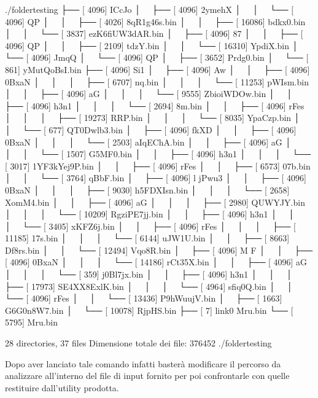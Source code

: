 \documentclass[letterpaper,10pt,italian,openany,oneside]{sphinxmanual}
\begin{document}
\begin{sphinxVerbatim}[commandchars=\\\{\}]
./folder\PYGZus{}testing
├── [       4096]  ICcJo
│   ├── [       4096]  2ymehX
│   │   └── [       4096]  QP
│   │       ├── [       4026]  8qR1g46s.bin
│   │       ├── [      16086]  bdkx0.bin
│   │       └── [       3837]  ezK6fiUW3dAR.bin
│   ├── [       4096]  87
│   │   ├── [       4096]  QP
│   │   ├── [       2109]  tdzY.bin
│   │   └── [      16310]  YpdiX.bin
│   └── [       4096]  JmqQ
│       └── [       4096]  QP
│           ├── [       3652]  Prdg0.bin
│           └── [        861]  yMutQoBsI.bin
├── [       4096]  Si1
│   ├── [       4096]  Aw
│   │   ├── [       4096]  0BxaN
│   │   │   ├── [       6707]  nq.bin
│   │   │   └── [      11253]  pWIsm.bin
│   │   ├── [       4096]  aG
│   │   │   └── [       9555]  ZbioiWDOw.bin
│   │   ├── [       4096]  h3n1
│   │   │   └── [       2694]  8m.bin
│   │   ├── [       4096]  rFes
│   │   │   ├── [      19273]  RRP.bin
│   │   │   └── [       8035]  YpaCzp.bin
│   │   └── [        677]  QT0Dwlb3.bin
│   ├── [       4096]  fkXD
│   │   ├── [       4096]  0BxaN
│   │   │   └── [       2503]  aIqEChA.bin
│   │   ├── [       4096]  aG
│   │   │   └── [       1507]  G5MF0.bin
│   │   ├── [       4096]  h3n1
│   │   │   └── [       3017]  1YF3kYej9P.bin
│   │   ├── [       4096]  rFes
│   │   ├── [       6573]  07b.bin
│   │   └── [       3764]  qBbF.bin
│   ├── [       4096]  l jPwu3
│   │   ├── [       4096]  0BxaN
│   │   │   ├── [       9030]  h5FDXIsn.bin
│   │   │   └── [       2658]  XomM4.bin
│   │   ├── [       4096]  aG
│   │   │   ├── [       2980]  QUWYJY.bin
│   │   │   └── [      10209]  RgziPE7jj.bin
│   │   ├── [       4096]  h3n1
│   │   │   └── [       3405]  xKFZ6j.bin
│   │   ├── [       4096]  rFes
│   │   │   ├── [      11185]  17s.bin
│   │   │   └── [       6144]  uJW1U.bin
│   │   ├── [       8663]  Df8rs.bin
│   │   └── [      12494]  Vqo8R.bin
│   ├── [       4096]  M F
│   │   ├── [       4096]  0BxaN
│   │   │   └── [      14186]  rCt35X.bin
│   │   ├── [       4096]  aG
│   │   │   └── [        359]  j0Bl7jx.bin
│   │   ├── [       4096]  h3n1
│   │   │   ├── [      17973]  SE4XX8ExlK.bin
│   │   │   └── [       4964]  sfiq0Q.bin
│   │   └── [       4096]  rFes
│   │       └── [      13436]  P9hWuujV.bin
│   ├── [       1663]  G6G0n8W7.bin
│   └── [      10078]  RjpHS.bin
├── [          7]  link\PYGZus{}0 \PYGZhy{}\PYGZgt{} Mru.bin
└── [       5795]  Mru.bin

28 directories, 37 files
Dimensione totale dei file: 376452      ./folder\PYGZus{}testing
\end{sphinxVerbatim}

Dopo aver lanciato tale comando infatti basterà modificare il percorso da analizzare all’interno del file di input fornito
per poi confrontarle con quelle restituire dall’utility prodotta.



\renewcommand{\indexname}{Indice}
\printindex
\end{document}
